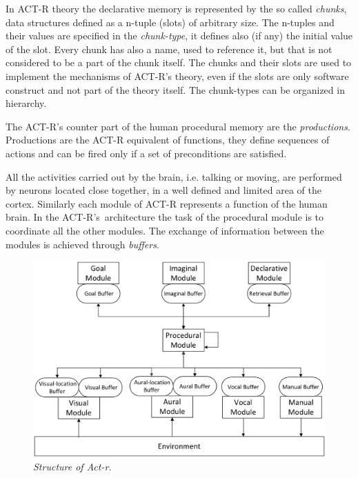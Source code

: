 In \mbox{ACT-R} theory the declarative memory is represented by the so called \emph{chunks}, data structures defined as a n-tuple (slots) of arbitrary size. The n-tuples and their values are specified in the \emph{chunk-type}, it defines also (if any) the initial value of the slot. Every chunk has also a name, used to reference it, but that is not considered to be a part of the chunk itself. The chunks and their slots are used to implement the mechanisms of \mbox{ACT-R's} theory, even if the slots are only software construct and not part of the theory itself. The chunk-types can be organized in hierarchy.

The \mbox{ACT-R's} counter part of the human procedural memory are the \emph{productions}. Productions are the \mbox{ACT-R} equivalent of functions, they define sequences of actions and can be fired only if a set of preconditions are satisfied. 



All the activities carried out by the brain, i.e. talking or moving, are performed by neurons located close together, in a well defined and limited area of the cortex. Similarly each module of \mbox{ACT-R} represents a function of the human brain. In the \mbox{ACT-R's architecture} the task of the procedural module is to coordinate all the other modules. The exchange of information between the modules is achieved through \emph{buffers}.

\begin{figure}[h]
\begin{center} 
\includegraphics[scale=0.25]{images/01-img/actr.eps}
\end{center} 
\caption{\textit{Structure of Act-r.}}  
\label{fig:modulesActr}
\end{figure}

